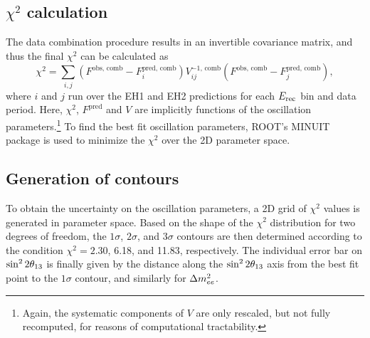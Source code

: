 \documentclass[../thesis.tex]{subfiles}
\begin{document}
\begin{comment}
The far site prediction is summed across the four far ADs.
\end{comment}

\begin{comment}
The far site data is summed across the four far ADs.
\end{comment}

\begin{comment}
See CombineMatrix in Predictor.cc.
\end{comment}

\begin{comment}
Correlations are implemented at the level of the toy MC.
\end{comment}
\subsection{$\chi^2$ calculation}
\label{sec:fitChi2}

The data combination procedure results in an invertible covariance matrix, and thus the final $\chi^2$ can be calculated as
\begin{equation}
  \chi^2 = \sum_{i,j} (F^{\mathrm{obs},\,\mathrm{comb}} - F^{\mathrm{pred},\,\mathrm{comb}}_i) V^{-1,\,\mathrm{comb}}_{ij} (F^{\mathrm{obs},\,\mathrm{comb}} - F^{\mathrm{pred},\,\mathrm{comb}}_j),
\end{equation}
where $i$ and $j$ run over the EH1 and EH2 predictions for each $E_\mathrm{rec}$ bin and data period. Here, $\chi^2$, $F^{\mathrm{pred}}$ and $V$ are implicitly functions of the oscillation parameters.\footnote{Again, the systematic components of $V$ are only rescaled, but not fully recomputed, for reasons of computational tractability.} To find the best fit oscillation parameters, ROOT's MINUIT package is used to minimize the $\chi^2$ over the 2D parameter space.

\begin{comment}
Just take $(Fpred_i - Fobs_i)V^{-1}_{ij}(Fpred_j - Fobs_j)$
\end{comment}

\subsection{Generation of contours}
\label{sec:fitContours}

To obtain the uncertainty on the oscillation parameters, a 2D grid of $\chi^2$ values is generated in parameter space. Based on the shape of the $\chi^2$ distribution for two degrees of freedom, the $1\sigma$, $2\sigma$, and $3\sigma$ contours are then determined according to the condition $\chi^2 = 2.30$, 6.18, and 11.83, respectively. The individual error bar on $\sin^2 2\theta_{13}$ is finally given by the distance along the $\sin^2 2\theta_{13}$ axis from the best fit point to the $1\sigma$ contour, and similarly for $\Delta m^2_{ee}$.
\end{document}
